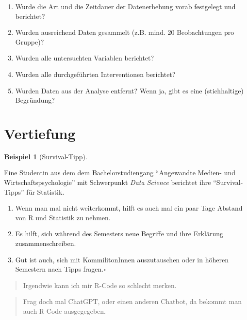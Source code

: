 \documentclass[
  letterpaper,
]{scrbook}
\providecommand{\tightlist}{%
  \setlength{\itemsep}{0pt}\setlength{\parskip}{0pt}}\usepackage{longtable,booktabs,array}
\theoremstyle{definition}
\newtheorem{example}{Beispiel}[chapter]
\theoremstyle{definition}
\theoremstyle{definition}
\theoremstyle{remark}
\begin{document}
\begin{enumerate}
\def\labelenumi{\arabic{enumi}.}
\tightlist
\item
  Wurde die Art und die Zeitdauer der Datenerhebung vorab festgelegt und
  berichtet?
\item
  Wurden ausreichend Daten gesammelt (z.B. mind. 20 Beobachtungen pro
  Gruppe)?
\item
  Wurden alle untersuchten Variablen berichtet?
\item
  Wurden alle durchgeführten Interventionen berichtet?
\item
  Wurden Daten aus der Analyse entfernt? Wenn ja, gibt es eine
  (stichhaltige) Begründung?
\end{enumerate}

\section{Vertiefung}\label{vertiefung-5}

\begin{example}[Survival-Tipp]\protect\hypertarget{exm-survival1}{}\label{exm-survival1}

Eine Studentin aus dem dem Bachelorstudiengang ``Angewandte Medien- und
Wirtschaftspsychologie'' mit Schwerpunkt \emph{Data Science} berichtet
ihre ``Survival-Tipps'' für Statistik.

\begin{enumerate}
\def\labelenumi{\arabic{enumi}.}
\tightlist
\item
  Wenn man mal nicht weiterkommt, hilft es auch mal ein paar Tage
  Abstand von R und Statistik zu nehmen.
\item
  Es hilft, sich während des Semesters neue Begriffe und ihre Erklärung
  zusammenschreiben.
\item
  Gut ist auch, sich mit KommilitonInnen auszutauschen oder in höheren
  Semestern nach Tipps fragen.\(\square\)
\end{enumerate}

\end{example}

\begin{quote}
{} Irgendwie kann ich mir R-Code so schlecht merken.
\end{quote}

\begin{quote}
{} Frag doch mal ChatGPT, oder einen anderen Chatbot, da
bekommt man auch R-Code ausgegegeben.
\end{quote}
\end{document}

